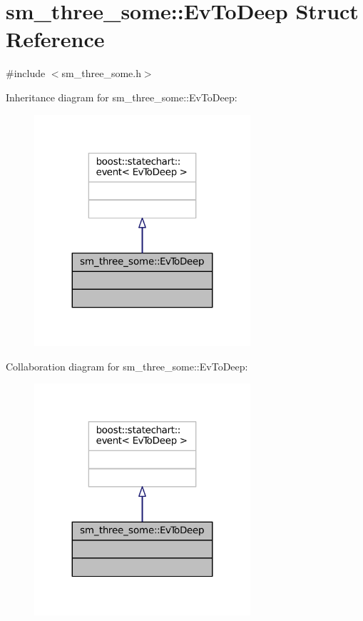 \hypertarget{structsm__three__some_1_1EvToDeep}{}\section{sm\+\_\+three\+\_\+some\+:\+:Ev\+To\+Deep Struct Reference}
\label{structsm__three__some_1_1EvToDeep}


{\ttfamily \#include $<$sm\+\_\+three\+\_\+some.\+h$>$}



Inheritance diagram for sm\+\_\+three\+\_\+some\+:\+:Ev\+To\+Deep\+:
\nopagebreak
\begin{figure}[H]
\begin{center}
\leavevmode
\includegraphics[width=227pt]{structsm__three__some_1_1EvToDeep__inherit__graph}
\end{center}
\end{figure}


Collaboration diagram for sm\+\_\+three\+\_\+some\+:\+:Ev\+To\+Deep\+:
\nopagebreak
\begin{figure}[H]
\begin{center}
\leavevmode
\includegraphics[width=227pt]{structsm__three__some_1_1EvToDeep__coll__graph}
\end{center}
\end{figure}



